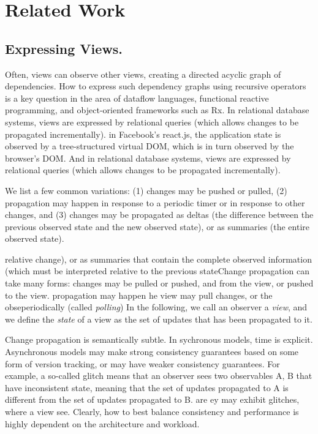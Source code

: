 \section{Related Work}


\hidden
{
\subsection{Expressing Views.} Often, views can observe other views, creating a directed acyclic graph of dependencies. How to express such dependency graphs using recursive operators is a key question in the area of dataflow languages, functional reactive programming, and object-oriented frameworks such as Rx. In relational database systems, views are expressed by relational queries (which allows changes to be propagated incrementally). in Facebook's react.js, the application state is observed by a tree-structured virtual DOM, which is in turn observed by the browser's DOM. And in relational database systems, views are expressed by relational queries (which allows changes to be propagated incrementally). 

We list a few common variations: (1) changes may be pushed or pulled, (2) propagation may happen in response to a periodic timer or in response to other changes, and (3) changes may be propagated as deltas (the difference between the previous observed state and the new observed state), or as summaries (the entire observed state).

  relative change), or as summaries that contain the complete observed information  (which must be interpreted relative to the previous stateChange propagation can take many forms: changes may be pulled or pushed, and from the view, or pushed to the view. propagation may happen he view may pull changes, or the obseperiodically (called \emph{polling}) In the following, we call an observer a \emph{view}, and we define the \emph{state} of a view as the set of updates that has been propagated to it. 




Change propagation is semantically subtle. In sychronous models, time is explicit. Asynchronous models may make strong consistency guarantees based on some form of version tracking, or may have weaker consistency guarantees. For example, a so-called glitch means that an observer sees two observables A, B that have inconsistent state, meaning that the set of updates propagated to A is different from the set of updates propagated to B. are ey may exhibit glitches, where a view see. Clearly, how to best balance consistency and performance is highly dependent on the architecture and workload. 
}

